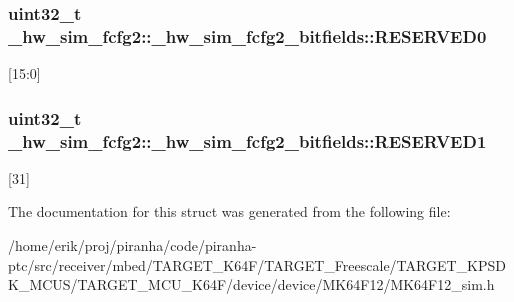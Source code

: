 \subsubsection[{\texorpdfstring{R\+E\+S\+E\+R\+V\+E\+D0}{RESERVED0}}]{\setlength{\rightskip}{0pt plus 5cm}uint32\+\_\+t \+\_\+hw\+\_\+sim\+\_\+fcfg2\+::\+\_\+hw\+\_\+sim\+\_\+fcfg2\+\_\+bitfields\+::\+R\+E\+S\+E\+R\+V\+E\+D0}\hypertarget{struct__hw__sim__fcfg2_1_1__hw__sim__fcfg2__bitfields_ab10334afd521f3d2f8c3f1ccdf002ee1}{}\label{struct__hw__sim__fcfg2_1_1__hw__sim__fcfg2__bitfields_ab10334afd521f3d2f8c3f1ccdf002ee1}
\mbox{[}15\+:0\mbox{]} 
\subsubsection[{\texorpdfstring{R\+E\+S\+E\+R\+V\+E\+D1}{RESERVED1}}]{\setlength{\rightskip}{0pt plus 5cm}uint32\+\_\+t \+\_\+hw\+\_\+sim\+\_\+fcfg2\+::\+\_\+hw\+\_\+sim\+\_\+fcfg2\+\_\+bitfields\+::\+R\+E\+S\+E\+R\+V\+E\+D1}\hypertarget{struct__hw__sim__fcfg2_1_1__hw__sim__fcfg2__bitfields_aaedbe79c816d1a629afa706cb7fb5a9a}{}\label{struct__hw__sim__fcfg2_1_1__hw__sim__fcfg2__bitfields_aaedbe79c816d1a629afa706cb7fb5a9a}
\mbox{[}31\mbox{]} 

The documentation for this struct was generated from the following file\+:\begin{DoxyCompactItemize}
\item 
/home/erik/proj/piranha/code/piranha-\/ptc/src/receiver/mbed/\+T\+A\+R\+G\+E\+T\+\_\+\+K64\+F/\+T\+A\+R\+G\+E\+T\+\_\+\+Freescale/\+T\+A\+R\+G\+E\+T\+\_\+\+K\+P\+S\+D\+K\+\_\+\+M\+C\+U\+S/\+T\+A\+R\+G\+E\+T\+\_\+\+M\+C\+U\+\_\+\+K64\+F/device/device/\+M\+K64\+F12/M\+K64\+F12\+\_\+sim.\+h\end{DoxyCompactItemize}
